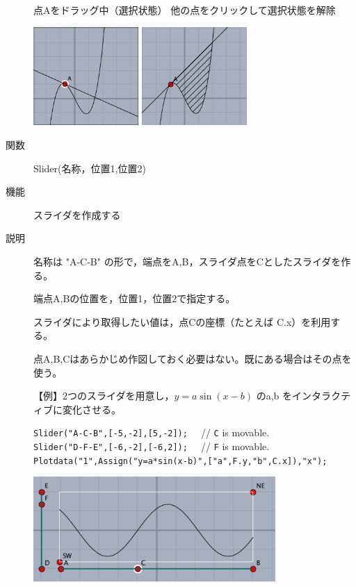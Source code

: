 \documentclass[papersize,a4paper,12pt,uplatex]{jsarticle}
\begin{document}
\begin{description}
\vspace{\baselineskip}
\hspace{5mm} 点Aをドラッグ中（選択状態）\hspace{5mm} 他の点をクリックして選択状態を解除

\hspace{10mm}\includegraphics[bb=0.00 0.00 218.01 204.51,width=40mm]{Fig/ptselected01.pdf} 
\hspace{10mm}\includegraphics[bb=0.00 0.00 219.01 204.51,width=40mm]{Fig/ptselected02.pdf} 

\vspace{\baselineskip}
\hypertarget{slider}{}
\item[関数]  Slider(名称，位置1,位置2)
\item[機能]  スライダを作成する
\item[説明]  名称は "A-C-B" の形で，端点をA,B，スライダ点をCとしたスライダを作る。

端点A,Bの位置を，位置1，位置2で指定する。

スライダにより取得したい値は，点Cの座標（たとえば C.x）を利用する。

点A,B,Cはあらかじめ作図しておく必要はない。既にある場合はその点を使う。

\vspace{\baselineskip}
【例】2つのスライダを用意し，$y=a\sin(x-b)$ のa,b をインタラクティブに変化させる。
  
\verb|Slider("A-C-B",[-5,-2],[5,-2]);  | // \verb|C| is movable.\\
\verb|Slider("D-F-E",[-6,-2],[-6,2]);  | // \verb|F| is movable.\\
\verb|Plotdata("1",Assign("y=a*sin(x-b)",["a",F.y,"b",C.x]),"x"); |

\vspace{\baselineskip}
\hspace{15mm}
\includegraphics[bb=0.00 0.00 445.02 193.01,height=40mm]{Fig/slider.pdf} 


\end{description}
\end{document}
